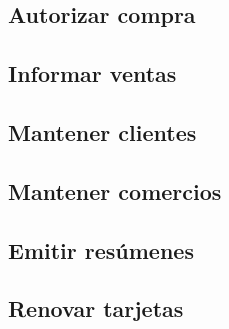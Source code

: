 \subsection{Autorizar compra}
\label{sec:modcasos:autorizarcompra}


\subsection{Informar ventas}
\label{sec:modcasos:informarventas}


\subsection{Mantener clientes}


\subsection{Mantener comercios}


\subsection{Emitir resúmenes}
\label{sec:modcasos:emitirresumenes}


\subsection{Renovar tarjetas}

